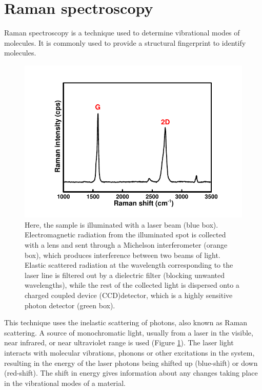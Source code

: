 \section{Raman spectroscopy}

Raman spectroscopy is a technique used to determine vibrational modes of molecules. It is commonly used to provide a structural fingerprint to identify molecules.
\begin{figure}[tbh!]
\centering
\includegraphics[width=\textwidth]{Figures/chap2fig/Raman}
\caption{Here, the sample is illuminated with a laser beam (blue box). Electromagnetic radiation from the illuminated spot is collected with a lens and sent through a Michelson interferometer (orange box), which produces interference between two beams of light. Elastic scattered radiation at the wavelength corresponding to the laser line is filtered out by a dielectric filter (blocking unwanted wavelengths), while the rest of the collected light is dispersed onto a charged coupled device (CCD)detector, which is a highly sensitive photon detector (green box).}
\label{Figures/chap2fig:Raman}
\end{figure}
This technique uses the inelastic scattering of photons, also known as Raman scattering. A source of monochromatic light, usually from a laser in the visible, near infrared, or near ultraviolet range is used (Figure \ref{Figures/chap2fig:Raman}). The laser light interacts with molecular vibrations, phonons or other excitations in the system, resulting in the energy of the laser photons being shifted up (blue-shift) or down (red-shift). The shift in energy gives information about any changes taking place in the vibrational modes of a material. 

